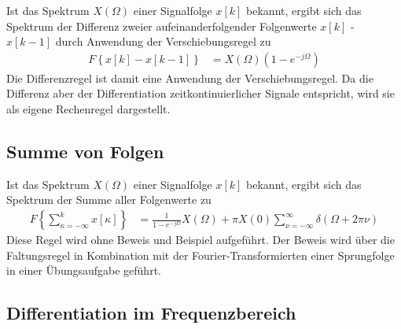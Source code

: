 Ist das Spektrum \(X(Ω)\) einer Signalfolge \(x[k]\) bekannt, ergibt sich das Spektrum der Differenz zweier aufeinanderfolgender Folgenwerte \(x[k]\) - \(x[k - 1]\) durch Anwendung der Verschiebungsregel zu
\begin{align}
F\left\{ x[ k] - x[ k - 1] \right\} &= X(\Omega)  \left( 1 - e^{- j  \Omega} \right) \label{eq:7.67}
\end{align}
Die Differenzregel ist damit eine Anwendung der Verschiebungsregel. Da die Differenz aber der Differentiation zeitkontinuierlicher Signale entspricht, wird sie als eigene Rechenregel dargestellt.

\subsection{Summe von Folgen}\label{sec:summe-von-folgen}

Ist das Spektrum \(X(Ω)\) einer Signalfolge \(x[k]\) bekannt, ergibt sich das Spektrum der Summe aller Folgenwerte zu
\begin{align}
F\left\{ \sum\limits_{\kappa = - \infty}^{k}{x[\kappa]} \right\} &= \frac{1}{1 - e^{- j  \Omega}}  X(\Omega) + \pi  X(0)  \sum\limits_{\nu = - \infty}^{\infty}{\delta(\Omega + 2  \pi  \nu)} \label{eq:7.68}
\end{align}
Diese Regel wird ohne Beweis und Beispiel aufgeführt. Der Beweis wird über die Faltungsregel in Kombination mit der Fourier-Transformierten einer Sprungfolge in einer Übungsaufgabe geführt.

\subsection{Differentiation im Frequenzbereich}\label{sec:differentiation-im-frequenzbereich}

